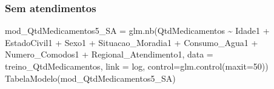 \documentclass[
]{article}
\newenvironment{Shaded}{\begin{snugshade}}{\end{snugshade}}
\newcommand{\AttributeTok}[1]{\textcolor[rgb]{0.77,0.63,0.00}{#1}}
\newcommand{\DecValTok}[1]{\textcolor[rgb]{0.00,0.00,0.81}{#1}}
\newcommand{\FunctionTok}[1]{\textcolor[rgb]{0.00,0.00,0.00}{#1}}
\newcommand{\NormalTok}[1]{#1}
\newcommand{\OtherTok}[1]{\textcolor[rgb]{0.56,0.35,0.01}{#1}}
\newcommand{\SpecialCharTok}[1]{\textcolor[rgb]{0.00,0.00,0.00}{#1}}
\newcommand{\StringTok}[1]{\textcolor[rgb]{0.31,0.60,0.02}{#1}}
\begin{document}
\hypertarget{sem-atendimentos-1}{%
\subsubsection{Sem atendimentos}\label{sem-atendimentos-1}}

\begin{Shaded}
\begin{Highlighting}[]
\NormalTok{mod\_QtdMedicamentos5\_SA }\OtherTok{=} \FunctionTok{glm.nb}\NormalTok{(QtdMedicamentos }\SpecialCharTok{\textasciitilde{}}\NormalTok{ Idade1 }\SpecialCharTok{+}\NormalTok{ EstadoCivil1 }\SpecialCharTok{+}\NormalTok{ Sexo1 }\SpecialCharTok{+}\NormalTok{ Situacao\_Moradia1 }\SpecialCharTok{+} 
\NormalTok{                                   Consumo\_Agua1 }\SpecialCharTok{+}\NormalTok{ Numero\_Comodos1 }\SpecialCharTok{+}
\NormalTok{                                   Regional\_Atendimento1, }\AttributeTok{data =}\NormalTok{ treino\_QtdMedicamentos, }\AttributeTok{link =} \StringTok{\textquotesingle{}log\textquotesingle{}}\NormalTok{, }\AttributeTok{control=}\FunctionTok{glm.control}\NormalTok{(}\AttributeTok{maxit=}\DecValTok{50}\NormalTok{))}
\FunctionTok{TabelaModelo}\NormalTok{(mod\_QtdMedicamentos5\_SA)}
\end{Highlighting}
\end{Shaded}
\end{document}
